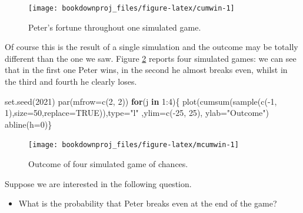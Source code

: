 \documentclass[
]{book}
\newenvironment{Shaded}{\begin{snugshade}}{\end{snugshade}}
\newcommand{\AttributeTok}[1]{\textcolor[rgb]{0.77,0.63,0.00}{#1}}
\newcommand{\ConstantTok}[1]{\textcolor[rgb]{0.00,0.00,0.00}{#1}}
\newcommand{\ControlFlowTok}[1]{\textcolor[rgb]{0.13,0.29,0.53}{\textbf{#1}}}
\newcommand{\DecValTok}[1]{\textcolor[rgb]{0.00,0.00,0.81}{#1}}
\newcommand{\FunctionTok}[1]{\textcolor[rgb]{0.00,0.00,0.00}{#1}}
\newcommand{\NormalTok}[1]{#1}
\newcommand{\SpecialCharTok}[1]{\textcolor[rgb]{0.00,0.00,0.00}{#1}}
\newcommand{\StringTok}[1]{\textcolor[rgb]{0.31,0.60,0.02}{#1}}
\providecommand{\tightlist}{%
  \setlength{\itemsep}{0pt}\setlength{\parskip}{0pt}}
\begin{document}
\begin{figure}

{\centering \texttt{[image: bookdownproj\_files/figure-latex/cumwin-1]} 

}

\caption{Peter's fortune throughout one simulated game.}\label{fig:cumwin}
\end{figure}

Of course this is the result of a single simulation and the outcome may be totally different than the one we saw. Figure \ref{fig:mcumwin} reports four simulated games: we can see that in the first one Peter wins, in the second he almost breaks even, whilst in the third and fourth he clearly loses.

\begin{Shaded}
\begin{Highlighting}[]
\FunctionTok{set.seed}\NormalTok{(}\DecValTok{2021}\NormalTok{)}
\FunctionTok{par}\NormalTok{(}\AttributeTok{mfrow=}\FunctionTok{c}\NormalTok{(}\DecValTok{2}\NormalTok{, }\DecValTok{2}\NormalTok{))}
\ControlFlowTok{for}\NormalTok{(j }\ControlFlowTok{in} \DecValTok{1}\SpecialCharTok{:}\DecValTok{4}\NormalTok{)\{}
  \FunctionTok{plot}\NormalTok{(}\FunctionTok{cumsum}\NormalTok{(}\FunctionTok{sample}\NormalTok{(}\FunctionTok{c}\NormalTok{(}\SpecialCharTok{{-}}\DecValTok{1}\NormalTok{, }\DecValTok{1}\NormalTok{),}\AttributeTok{size=}\DecValTok{50}\NormalTok{,}\AttributeTok{replace=}\ConstantTok{TRUE}\NormalTok{)),}\AttributeTok{type=}\StringTok{"l"}\NormalTok{ ,}\AttributeTok{ylim=}\FunctionTok{c}\NormalTok{(}\SpecialCharTok{{-}}\DecValTok{25}\NormalTok{, }\DecValTok{25}\NormalTok{), }\AttributeTok{ylab=}\StringTok{"Outcome"}\NormalTok{)}
  \FunctionTok{abline}\NormalTok{(}\AttributeTok{h=}\DecValTok{0}\NormalTok{)\}}
\end{Highlighting}
\end{Shaded}

\begin{figure}

{\centering \texttt{[image: bookdownproj\_files/figure-latex/mcumwin-1]} 

}

\caption{Outcome of four simulated game of chances.}\label{fig:mcumwin}
\end{figure}

Suppose we are interested in the following question.

\begin{itemize}
\tightlist
\item
  What is the probability that Peter breaks even at the end of the game?
\end{itemize}
\end{document}
